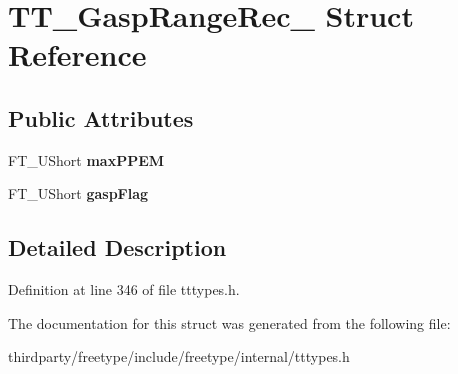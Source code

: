 \hypertarget{struct_t_t___gasp_range_rec__}{}\section{T\+T\+\_\+\+Gasp\+Range\+Rec\+\_\+ Struct Reference}
\label{struct_t_t___gasp_range_rec__}
\subsection*{Public Attributes}
\begin{DoxyCompactItemize}
\item 
\mbox{\label{struct_t_t___gasp_range_rec___aa3fab31f6c0659b4deff402e210e15c9}} 
F\+T\+\_\+\+U\+Short {\bfseries max\+P\+P\+EM}
\item 
\mbox{\label{struct_t_t___gasp_range_rec___a9fc298dc0e46d31507728ae25585118d}} 
F\+T\+\_\+\+U\+Short {\bfseries gasp\+Flag}
\end{DoxyCompactItemize}


\subsection{Detailed Description}


Definition at line 346 of file tttypes.\+h.



The documentation for this struct was generated from the following file\+:\begin{DoxyCompactItemize}
\item 
thirdparty/freetype/include/freetype/internal/tttypes.\+h\end{DoxyCompactItemize}
